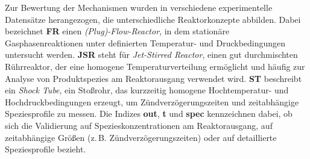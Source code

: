             Zur Bewertung der Mechanismen wurden in \textcite{ZHANG2025114499} verschiedene experimentelle Datensätze herangezogen, 
            die unterschiedliche Reaktorkonzepte abbilden. Dabei bezeichnet \textbf{FR} einen \textit{(Plug)-Flow-Reactor}, in dem stationäre Gasphasenreaktionen unter definierten Temperatur- und Druckbedingungen untersucht werden. 
            \textbf{JSR} steht für \textit{Jet-Stirred Reactor}, einen gut durchmischten Rührreaktor, der eine homogene Temperaturverteilung ermöglicht 
            und häufig zur Analyse von Produktspezies am Reaktorausgang verwendet wird. 
            \textbf{ST} beschreibt ein \textit{Shock Tube}, ein Stoßrohr, das kurzzeitig homogene Hochtemperatur- und Hochdruckbedingungen erzeugt, 
            um Zündverzögerungszeiten und zeitabhängige Speziesprofile zu messen. 
            Die Indizes \textbf{out}, \textbf{t} und \textbf{spec} kennzeichnen dabei, ob sich die Validierung auf Spezieskonzentrationen am Reaktorausgang, 
            auf zeitabhängige Größen (z.\,B. Zündverzögerungszeiten) oder auf detaillierte Speziesprofile bezieht.

